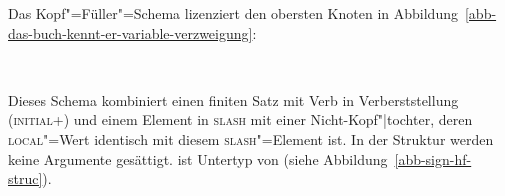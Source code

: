 Das Kopf"=Füller"=Schema lizenziert den obersten Knoten in Abbildung~\ref{abb-das-buch-kennt-er-variable-verzweigung}:
\begin{schema}[Kopf"=Füller"=Schema]
\label{hf-schemaa}%
 \impl\\
\end{schema}
Dieses Schema kombiniert einen finiten Satz mit Verb in Verberststellung (\textsc{initial}+) und einem Element in \textsc{slash}
mit einer Nicht-Kopf"|tochter, deren \textsc{local}"=Wert identisch mit diesem \textsc{slash}"=Element ist.
In der Struktur werden keine Argumente gesättigt.  ist Untertyp von 
(siehe Abbildung~\vref{abb-sign-hf-struc}).
